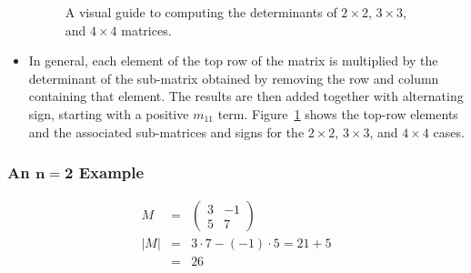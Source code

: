 \documentclass[12pt]{article}
\begin{document}
\begin{itemize}
\begin{figure}[h!]
\begin{center}
\caption{A visual guide to computing the determinants of $2 \times 2$, $3
  \times 3$, and $4 \times 4$ matrices.}
\label{fig:dets}
\end{center}
\end{figure}

\item In general, each element of the top row of the matrix is
  multiplied by the determinant of the sub-matrix obtained by removing
  the row and column containing that element. The results are
  then added together with alternating sign, starting with a positive
  $m_{11}$ term. Figure~\ref{fig:dets} shows the top-row elements and
  the associated sub-matrices and signs for the $2 \times 2$, $3
  \times 3$, and $4 \times 4$ cases.

\end{itemize}

\subsubsection*{An $\mathbf{n=2}$ Example}
\begin{eqnarray}
\nonumber
M &=& 
\left(
\begin{array}{cccc}
3  & -1 \\
5  &  7 
\end{array}
\right) \\
|M| &=& 3 \cdot 7 - (-1)\cdot 5 = 21 + 5 \\
    &=& 26
\end{eqnarray}
\end{document}
